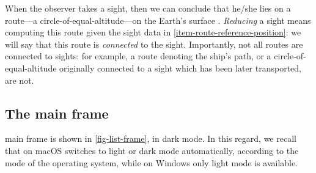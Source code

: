 \documentclass{ol-softwaremanual}
\begin{document}
When the observer takes a \gls{sight}, then we can conclude that he/she lies on a \gls{route}---a \gls{circle-of-equal-altitude}---on the Earth's surface \cite{bowditch2002the}. 
\textit{Reducing} a \gls{sight} means computing this \gls{route} given the \gls{sight} data in \cref{item-route-reference-position}: we will say that this \gls{route} is \textit{connected} to the \gls{sight}. Importantly, not all \glspl{route} are connected to \glspl{sight}: for example, a \gls{route} denoting the ship's path, or a \gls{circle-of-equal-altitude} originally connected to a \gls{sight} which has been later \gls{transported}, are not. 



\subsection{The main frame}

\thel main frame is shown in \cref{fig-list-frame}, in dark mode.
In this regard, we recall that on macOS \thel switches to light or dark mode automatically, according to the mode of the operating system, while on Windows only light mode is available. 
\end{document}
